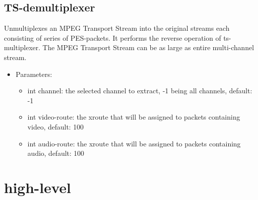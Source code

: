 \subsection{TS-demultiplexer}
Unmultiplexes an MPEG Transport Stream into the original streams each consisting of series of PES-packets. It performs the reverse operation of ts-multiplexer. The MPEG Transport Stream can be as large as entire multi-channel stream.
\begin{itemize}
\item Parameters:
\begin{itemize}
\item int channel: the selected channel to extract, -1 being all channels, default: -1
\item int video-route: the xroute that will be assigned to packets containing video, default: 100
\item int audio-route: the xroute that will be assigned to packets containing audio, default: 100
\end{itemize}
\end{itemize}
\newpage
\section{high-level}

